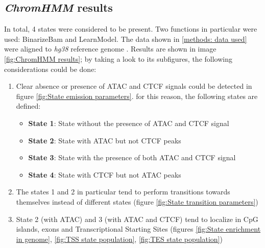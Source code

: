 \subsection{\textit{ChromHMM} results} \label{chap: ChromHMM results} %

In total, 4 states were considered to be present. Two functions in particular were used: BinarizeBam and LearnModel. The data shown in \ref{methods: data used} were aligned to \textit{hg38} reference genome
\cite{HomoSapiensGenome}
. Results are shown in image \ref{fig:ChromHMM results}; by taking a look to its subfigures, the following considerations could be done:

\begin{enumerate}
  \item Clear absence or presence of ATAC and CTCF signals could be detected in figure \ref{fig:State emission parameters}. for this reason, the following states are defined:
  \begin{itemize}
    \item \textbf{State 1}: State without the presence of ATAC and CTCF signal
    \item \textbf{State 2}: State with ATAC but not CTCF peaks
    \item \textbf{State 3}: State with the presence of both ATAC and CTCF signal
    \item \textbf{State 4}: State with CTCF but not ATAC peaks
  \end{itemize}
  \item The states 1 and 2 in particular tend to perform transitions towards themselves instead of different states (figure \ref{fig:State transition parameters})
  \item State 2 (with ATAC) and 3 (with ATAC and CTCF) tend to localize in CpG islands, exons and Transcriptional Starting Sites (figures \ref{fig:State enrichment in genome}, \ref{fig:TSS state population}, \ref{fig:TES state population})
\end{enumerate}

